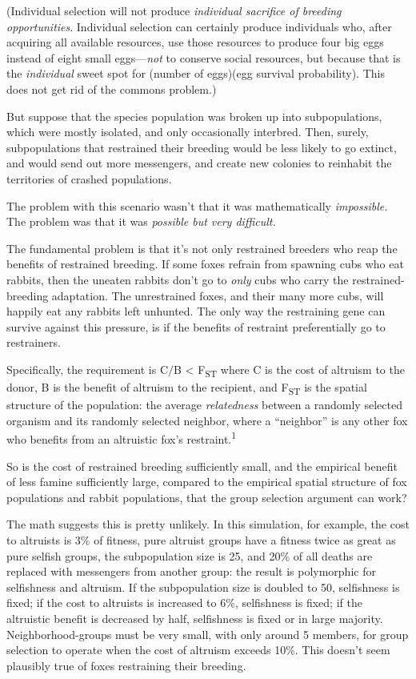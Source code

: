 {
 (Individual selection will not produce \textit{individual
sacrifice of breeding opportunities}. Individual selection can
certainly produce individuals who, after acquiring all available
resources, use those resources to produce four big eggs instead of
eight small eggs---\textit{not} to conserve social resources, but
because that is the \textit{individual} sweet spot for (number of
eggs){\texttimes}(egg survival probability). This does not get rid of
the commons problem.)}

{
 But suppose that the species population was broken up into
subpopulations, which were mostly isolated, and only occasionally
interbred. Then, surely, subpopulations that restrained their breeding
would be less likely to go extinct, and would send out more messengers,
and create new colonies to reinhabit the territories of crashed
populations.}

{
 The problem with this scenario wasn't that it was
mathematically \textit{impossible.} The problem was that it was
\textit{possible but very difficult.}}

{
 The fundamental problem is that it's not only
restrained breeders who reap the benefits of restrained breeding. If
some foxes refrain from spawning cubs who eat rabbits, then the uneaten
rabbits don't go to \textit{only} cubs who carry the
restrained-breeding adaptation. The unrestrained foxes, and their many
more cubs, will happily eat any rabbits left unhunted. The only way the
restraining gene can survive against this pressure, is if the benefits
of restraint preferentially go to restrainers.}

{
 Specifically, the requirement is C$/$B {\textless}
F\textsubscript{ST} where C is the cost of altruism to the donor, B is
the benefit of altruism to the recipient, and F\textsubscript{ST} is
the spatial structure of the population: the average
\textit{relatedness} between a randomly selected organism and its
randomly selected neighbor, where a
``neighbor'' is any other fox who
benefits from an altruistic fox's
restraint.\textsuperscript{1}}

{
 So is the cost of restrained breeding sufficiently small, and the
empirical benefit of less famine sufficiently large, compared to the
empirical spatial structure of fox populations and rabbit populations,
that the group selection argument can work?}

{
 The math suggests this is pretty unlikely. In this simulation, for
example, the cost to altruists is 3\% of fitness, pure altruist groups
have a fitness twice as great as pure selfish groups, the subpopulation
size is 25, and 20\% of all deaths are replaced with messengers from
another group: the result is polymorphic for selfishness and altruism.
If the subpopulation size is doubled to 50, selfishness is fixed; if
the cost to altruists is increased to 6\%, selfishness is fixed; if the
altruistic benefit is decreased by half, selfishness is fixed or in
large majority. Neighborhood-groups must be very small, with only
around 5 members, for group selection to operate when the cost of
altruism exceeds 10\%. This doesn't seem plausibly true
of foxes restraining their breeding.}

